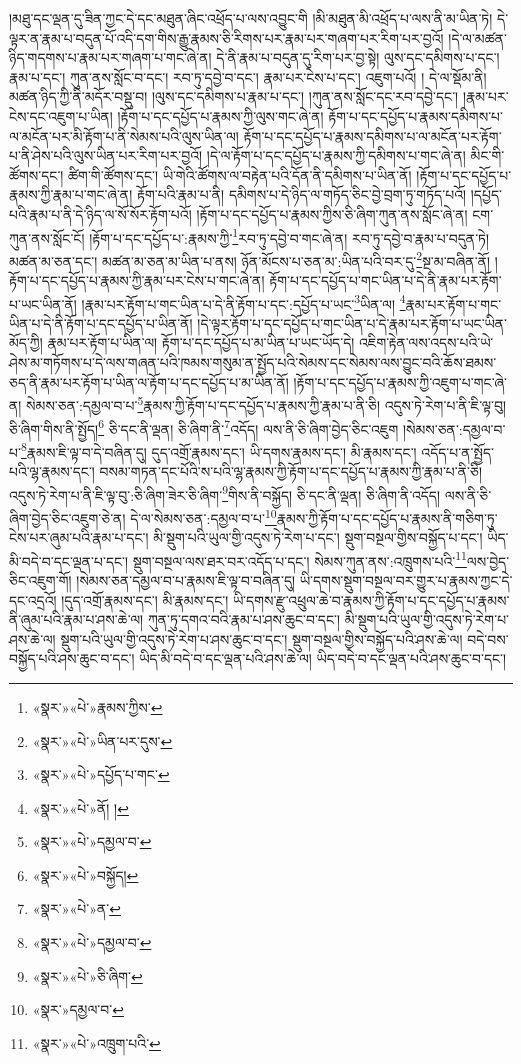 །མཐུ་དང་ལྡན་དུ་ཟིན་ཀྱང་དེ་དང་མཐུན་ཞིང་འཕྲོད་པ་ལས་འབྱུང་གི །མི་མཐུན་མི་འཕྲོད་པ་ལས་ནི་མ་ཡིན་ཏེ། དེ་ལྟར་ན་རྣམ་པ་བདུན་པོ་འདི་དག་གིས་རྒྱུ་རྣམས་ཅི་རིགས་པར་རྣམ་པར་གཞག་པར་རིག་པར་བྱའོ། །དེ་ལ་མཚན་ཉིད་གདགས་པ་རྣམ་པར་གཞག་པ་གང་ཞེ་ན། དེ་ནི་རྣམ་པ་བདུན་དུ་རིག་པར་བྱ་སྟེ། ལུས་དང་དམིགས་པ་དང་། རྣམ་པ་དང་། ཀུན་ནས་སློང་བ་དང་། རབ་ཏུ་དབྱེ་བ་དང་། རྣམ་པར་ངེས་པ་དང་། འཇུག་པའོ། །
དེ་ལ་སྡོམ་ནི། མཚན་ཉིད་ཀྱི་ནི་མདོར་བསྡུ་བ། །ལུས་དང་དམིགས་པ་རྣམ་པ་དང་། །ཀུན་ནས་སློང་དང་རབ་དབྱེ་དང་། །རྣམ་པར་ངེས་དང་འཇུག་པ་ཡིན། །རྟོག་པ་དང་དཔྱོད་པ་རྣམས་ཀྱི་ལུས་གང་ཞེ་ན། རྟོག་པ་དང་དཔྱོད་པ་རྣམས་དམིགས་པ་ལ་མངོན་པར་མི་རྟོག་པ་ནི་སེམས་པའི་ལུས་ཡིན་ལ། རྟོག་པ་དང་དཔྱོད་པ་རྣམས་དམིགས་པ་ལ་མངོན་པར་རྟོག་པ་ནི་ཤེས་པའི་ལུས་ཡིན་པར་རིག་པར་བྱའོ། །དེ་ལ་རྟོག་པ་དང་དཔྱོད་པ་རྣམས་ཀྱི་དམིགས་པ་གང་ཞེ་ན། མིང་གི་ཚོགས་དང་། ཚིག་གི་ཚོགས་དང་། ཡི་གེའི་ཚོགས་ལ་བརྟེན་པའི་དོན་ནི་དམིགས་པ་ཡིན་ནོ། །རྟོག་པ་དང་དཔྱོད་པ་རྣམས་ཀྱི་རྣམ་པ་གང་ཞེ་ན། རྟོག་པའི་རྣམ་པ་ནི། དམིགས་པ་དེ་ཉིད་ལ་གཏོད་ཅིང་བྱེ་བྲག་ཏུ་གཏོད་པའོ། །དཔྱོད་པའི་རྣམ་པ་ནི་དེ་ཉིད་ལ་སོ་སོར་རྟོག་པའོ། །རྟོག་པ་དང་དཔྱོད་པ་རྣམས་ཀྱིས་ཅི་ཞིག་ཀུན་ནས་སློང་ཞེ་ན། ངག་ཀུན་ནས་སློང་ངོ། །རྟོག་པ་དང་དཔྱོད་པ་:རྣམས་ཀྱི་\footnote{«སྣར་»«པེ་»རྣམས་ཀྱིས་}རབ་ཏུ་དབྱེ་བ་གང་ཞེ་ན། རབ་ཏུ་དབྱེ་བ་རྣམ་པ་བདུན་ཏེ། མཚན་མ་ཅན་དང་། མཚན་མ་ཅན་མ་ཡིན་པ་ནས། ཉོན་མོངས་པ་ཅན་མ་:ཡིན་པའི་བར་དུ་\footnote{«སྣར་»«པེ་»ཡིན་པར་དུས་}སྔ་མ་བཞིན་ནོ། །རྟོག་པ་དང་དཔྱོད་པ་རྣམས་ཀྱི་རྣམ་པར་ངེས་པ་གང་ཞེ་ན། རྟོག་པ་དང་དཔྱོད་པ་གང་ཡིན་པ་དེ་ནི་རྣམ་པར་རྟོག་པ་ཡང་ཡིན་ནོ། །རྣམ་པར་རྟོག་པ་གང་ཡིན་པ་དེ་ནི་རྟོག་པ་དང་:དཔྱོད་པ་ཡང་\footnote{«སྣར་»«པེ་»དཔྱོད་པ་གང་}ཡིན་ལ། \footnote{«སྣར་»«པེ་»ནོ། ། }རྣམ་པར་རྟོག་པ་གང་ཡིན་པ་དེ་ནི་རྟོག་པ་དང་དཔྱོད་པ་ཡིན་ནོ། །དེ་ལྟར་རྟོག་པ་དང་དཔྱོད་པ་གང་ཡིན་པ་དེ་རྣམ་པར་རྟོག་པ་ཡང་ཡིན་མོད་ཀྱི། རྣམ་པར་རྟོག་པ་ཡིན་ལ། རྟོག་པ་དང་དཔྱོད་པ་མ་ཡིན་པ་ཡང་ཡོད་དེ། འཇིག་རྟེན་ལས་འདས་པའི་ཡེ་ཤེས་མ་གཏོགས་པ་དེ་ལས་གཞན་པའི་ཁམས་གསུམ་ན་སྤྱོད་པའི་སེམས་དང་སེམས་ལས་བྱུང་བའི་ཆོས་ཐམས་ཅད་ནི་རྣམ་པར་རྟོག་པ་ཡིན་ལ་རྟོག་པ་དང་དཔྱོད་པ་མ་ཡིན་ནོ། །རྟོག་པ་དང་དཔྱོད་པ་རྣམས་ཀྱི་འཇུག་པ་གང་ཞེ་ན། སེམས་ཅན་:དམྱལ་བ་པ་\footnote{«སྣར་»«པེ་»དམྱལ་བ་}རྣམས་ཀྱི་རྟོག་པ་དང་དཔྱོད་པ་རྣམས་ཀྱི་རྣམ་པ་ནི་ཅི། འདུས་ཏེ་རེག་པ་ནི་ཇི་ལྟ་བུ། ཅི་ཞིག་གིས་ནི་སྤྱོད།\footnote{«སྣར་»«པེ་»བསྐྱོད།} ཅི་དང་ནི་ལྡན། ཅི་ཞིག་ནི་\footnote{«སྣར་»«པེ་»ན་}འདོད། ལས་ནི་ཅི་ཞིག་བྱེད་ཅིང་འཇུག །སེམས་ཅན་:དམྱལ་བ་པ་\footnote{«སྣར་»«པེ་»དམྱལ་བ་}རྣམས་ཇི་ལྟ་བ་དེ་བཞིན་དུ། དུད་འགྲོ་རྣམས་དང་། ཡི་དགས་རྣམས་དང་། མི་རྣམས་དང་། འདོད་པ་ན་སྤྱོད་པའི་ལྷ་རྣམས་དང་། བསམ་གཏན་དང་པོའི་ས་པའི་ལྷ་རྣམས་ཀྱི་རྟོག་པ་དང་དཔྱོད་པ་རྣམས་ཀྱི་རྣམ་པ་ནི་ཅི། འདུས་ཏེ་རེག་པ་ནི་ཇི་ལྟ་བུ་:ཅི་ཞིག་ཟེར་ཅི་ཞིག་\footnote{«སྣར་»«པེ་»ཅི་ཞིག་}གིས་ནི་བསྐྱོད། ཅི་དང་ནི་ལྡན། ཅི་ཞིག་ནི་འདོད། ལས་ནི་ཅི་ཞིག་བྱེད་ཅིང་འཇུག་ཅེ་ན། དེ་ལ་སེམས་ཅན་:དམྱལ་བ་པ་\footnote{«སྣར་»དམྱལ་བ་}རྣམས་ཀྱི་རྟོག་པ་དང་དཔྱོད་པ་རྣམས་ནི་གཅིག་ཏུ་ངེས་པར་ཞུམ་པའི་རྣམ་པ་དང་། མི་སྡུག་པའི་ཡུལ་གྱི་འདུས་ཏེ་རེག་པ་དང་། སྡུག་བསྔལ་གྱིས་བསྐྱོད་པ་དང་། ཡིད་མི་བདེ་བ་དང་ལྡན་པ་དང་། སྡུག་བསྔལ་ལས་ཐར་བར་འདོད་པ་དང་། སེམས་ཀུན་ནས་:འཁྲུགས་པའི་\footnote{«སྣར་»«པེ་»འཁྲུག་པའི་}ལས་བྱེད་ཅིང་འཇུག་གོ། །སེམས་ཅན་དམྱལ་བ་པ་རྣམས་ཇི་ལྟ་བ་བཞིན་དུ། ཡི་དགས་སྡུག་བསྔལ་བར་གྱུར་པ་རྣམས་ཀྱང་དེ་དང་འདྲའོ། །དུད་འགྲོ་རྣམས་དང་། མི་རྣམས་དང་། ཡི་དགས་རྫུ་འཕྲུལ་ཆེ་བ་རྣམས་ཀྱི་རྟོག་པ་དང་དཔྱོད་པ་རྣམས་ནི་ཞུམ་པའི་རྣམ་པ་ཤས་ཆེ་ལ། ཀུན་ཏུ་དགའ་བའི་རྣམ་པ་ཤས་ཆུང་བ་དང་། མི་སྡུག་པའི་ཡུལ་གྱི་འདུས་ཏེ་རེག་པ་ཤས་ཆེ་ལ། སྡུག་པའི་ཡུལ་གྱི་འདུས་ཏེ་རེག་པ་ཤས་ཆུང་བ་དང་། སྡུག་བསྔལ་གྱིས་བསྐྱོད་པའི་ཤས་ཆེ་ལ། བདེ་བས་བསྐྱོད་པའི་ཤས་ཆུང་བ་དང་། ཡིད་མི་བདེ་བ་དང་ལྡན་པའི་ཤས་ཆེ་ལ། ཡིད་བདེ་བ་དང་ལྡན་པའི་ཤས་ཆུང་བ་དང་། 